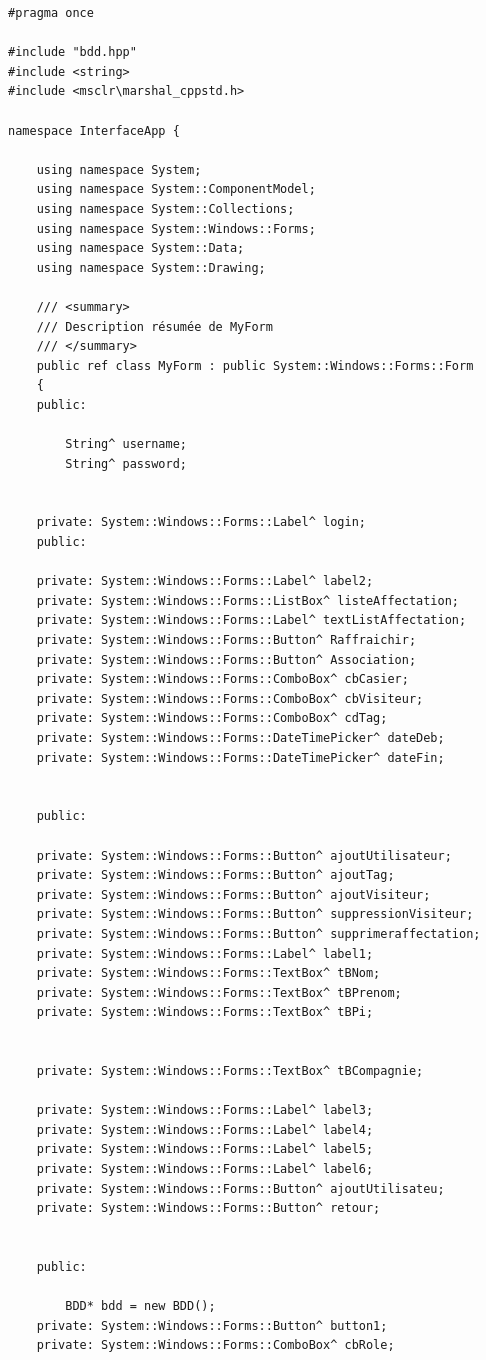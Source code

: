 \documentclass[main.tex]{subfiles}
\begin{document}
\begin{lstlisting}
#pragma once

#include "bdd.hpp"
#include <string>
#include <msclr\marshal_cppstd.h>

namespace InterfaceApp {

	using namespace System;
	using namespace System::ComponentModel;
	using namespace System::Collections;
	using namespace System::Windows::Forms;
	using namespace System::Data;
	using namespace System::Drawing;

	/// <summary>
	/// Description résumée de MyForm
	/// </summary>
	public ref class MyForm : public System::Windows::Forms::Form
	{
	public:

		String^ username;
		String^ password;


	private: System::Windows::Forms::Label^ login;
	public:

	private: System::Windows::Forms::Label^ label2;
	private: System::Windows::Forms::ListBox^ listeAffectation;
	private: System::Windows::Forms::Label^ textListAffectation;
	private: System::Windows::Forms::Button^ Raffraichir;
	private: System::Windows::Forms::Button^ Association;
	private: System::Windows::Forms::ComboBox^ cbCasier;
	private: System::Windows::Forms::ComboBox^ cbVisiteur;
	private: System::Windows::Forms::ComboBox^ cdTag;
	private: System::Windows::Forms::DateTimePicker^ dateDeb;
	private: System::Windows::Forms::DateTimePicker^ dateFin;


	public:
		
	private: System::Windows::Forms::Button^ ajoutUtilisateur;
	private: System::Windows::Forms::Button^ ajoutTag;
	private: System::Windows::Forms::Button^ ajoutVisiteur;
	private: System::Windows::Forms::Button^ suppressionVisiteur;
	private: System::Windows::Forms::Button^ supprimeraffectation;
	private: System::Windows::Forms::Label^ label1;
	private: System::Windows::Forms::TextBox^ tBNom;
	private: System::Windows::Forms::TextBox^ tBPrenom;
	private: System::Windows::Forms::TextBox^ tBPi;


	private: System::Windows::Forms::TextBox^ tBCompagnie;

	private: System::Windows::Forms::Label^ label3;
	private: System::Windows::Forms::Label^ label4;
	private: System::Windows::Forms::Label^ label5;
	private: System::Windows::Forms::Label^ label6;
	private: System::Windows::Forms::Button^ ajoutUtilisateu;
	private: System::Windows::Forms::Button^ retour;


	public:

		BDD* bdd = new BDD();
	private: System::Windows::Forms::Button^ button1;
	private: System::Windows::Forms::ComboBox^ cbRole;



\end{lstlisting}
\end{document}
